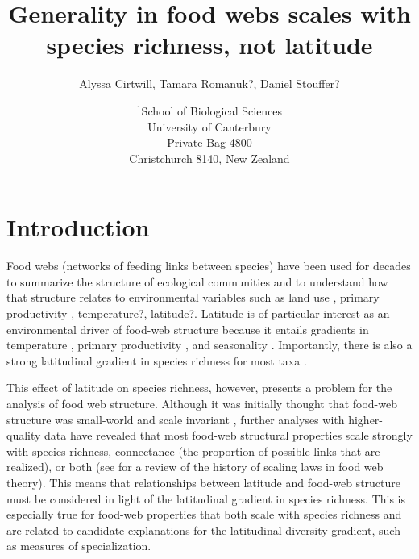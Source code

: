 \documentclass[12pt]{article}
\title{Generality in food webs scales with species richness, not latitude}
\author{Alyssa Cirtwill, Tamara Romanuk?, Daniel Stouffer?}
\date{$^1$School of Biological Sciences\\University of Canterbury\\
Private Bag 4800\\Christchurch 8140, New Zealand}
\begin{document}
\maketitle
\baselineskip=8.5mm
 
\vspace{0.4 in}


\section*{Introduction}

Food webs (networks of feeding links between species) have been used for decades to summarize the structure of 
ecological communities \citep{Williams2000,earlierwork} and to understand how that structure relates to environmental variables 
such as land use \citep{Townsend1998,Townsend2004c,Digel2014}, primary productivity \citep{}, temperature?, latitude?. 
Latitude is of particular interest as an environmental driver of food-web structure because it entails gradients in 
temperature \citep{}, primary productivity \citep{}, and seasonality \citep{}. Importantly, there is also a strong
latitudinal gradient in species richness for most taxa \citep{Schemske2009a}.


This effect of latitude on species richness, however, presents a problem for the analysis of food web structure.
Although it was initially thought that food-web structure was small-world and scale invariant \citep{}, further 
analyses with higher-quality data have revealed that most food-web structural properties scale strongly with species 
richness, connectance (the proportion of possible links that are realized), or both \citep{Riede2010} 
(see \citet{Dunne2006} for a review of the history of scaling laws in food web theory). This means that relationships
between latitude and food-web structure must be considered in light of the latitudinal gradient in species richness.
This is especially true for food-web properties that both scale with species richness and are related to candidate
explanations for the latitudinal diversity gradient, such as measures of specialization.
\end{document}

